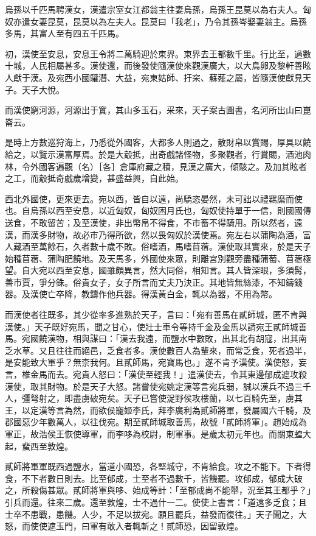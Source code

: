 \begin{pinyinscope}
烏孫以千匹馬聘漢女，漢遣宗室女江都翁主往妻烏孫，烏孫王昆莫以為右夫人。匈奴亦遣女妻昆莫，昆莫以為左夫人。昆莫曰「我老」，乃令其孫岑娶妻翁主。烏孫多馬，其富人至有四五千匹馬。

初，漢使至安息，安息王令將二萬騎迎於東界。東界去王都數千里。行比至，過數十城，人民相屬甚多。漢使還，而後發使隨漢使來觀漢廣大，以大鳥卵及黎軒善眩人獻于漢。及宛西小國驩潛、大益，宛東姑師、扜穼、蘇薤之屬，皆隨漢使獻見天子。天子大悅。

而漢使窮河源，河源出于窴，其山多玉石，采來，天子案古圖書，名河所出山曰崑崙云。

是時上方數巡狩海上，乃悉從外國客，大都多人則過之，散財帛以賞賜，厚具以饒給之，以覽示漢富厚焉。於是大觳抵，出奇戲諸怪物，多聚觀者，行賞賜，酒池肉林，令外國客遍觀（名）［各］倉庫府藏之積，見漢之廣大，傾駭之。及加其眩者之工，而觳抵奇戲歲增變，甚盛益興，自此始。

西北外國使，更來更去。宛以西，皆自以遠，尚驕恣晏然，未可詘以禮羈縻而使也。自烏孫以西至安息，以近匈奴，匈奴困月氏也，匈奴使持單于一信，則國國傳送食，不敢留苦；及至漢使，非出幣帛不得食，不市畜不得騎用。所以然者，遠漢，而漢多財物，故必市乃得所欲，然以畏匈奴於漢使焉。宛左右以蒲陶為酒，富人藏酒至萬餘石，久者數十歲不敗。俗嗜酒，馬嗜苜蓿。漢使取其實來，於是天子始種苜蓿、蒲陶肥饒地。及天馬多，外國使來眾，則離宮別觀旁盡種蒲萄、苜蓿極望。自大宛以西至安息，國雖頗異言，然大同俗，相知言。其人皆深眼，多須髯，善市賈，爭分銖。俗貴女子，女子所言而丈夫乃決正。其地皆無絲漆，不知鑄錢器。及漢使亡卒降，教鑄作他兵器。得漢黃白金，輒以為器，不用為幣。

而漢使者往既多，其少從率多進熟於天子，言曰：「宛有善馬在貳師城，匿不肯與漢使。」天子既好宛馬，聞之甘心，使壯士車令等持千金及金馬以請宛王貳師城善馬。宛國饒漢物，相與謀曰：「漢去我遠，而鹽水中數敗，出其北有胡寇，出其南乏水草。又且往往而絕邑，乏食者多。漢使數百人為輩來，而常乏食，死者過半，是安能致大軍乎？無柰我何。且貳師馬，宛寶馬也。」遂不肯予漢使。漢使怒，妄言，椎金馬而去。宛貴人怒曰：「漢使至輕我！」遣漢使去，令其東邊郁成遮攻殺漢使，取其財物。於是天子大怒。諸嘗使宛姚定漢等言宛兵弱，誠以漢兵不過三千人，彊弩射之，即盡虜破宛矣。天子已嘗使浞野侯攻樓蘭，以七百騎先至，虜其王，以定漢等言為然，而欲侯寵姬李氏，拜李廣利為貳師將軍，發屬國六千騎，及郡國惡少年數萬人，以往伐宛。期至貳師城取善馬，故號「貳師將軍」。趙始成為軍正，故浩侯王恢使導軍，而李哆為校尉，制軍事。是歲太初元年也。而關東蝗大起，蜚西至敦煌。

貳師將軍軍既西過鹽水，當道小國恐，各堅城守，不肯給食。攻之不能下。下者得食，不下者數日則去。比至郁成，士至者不過數千，皆饑罷。攻郁成，郁成大破之，所殺傷甚眾。貳師將軍與哆、始成等計：「至郁成尚不能舉，況至其王都乎？」引兵而還。往來二歲。還至敦煌，士不過什一二。使使上書言：「道遠多乏食；且士卒不患戰，患饑。人少，不足以拔宛。願且罷兵，益發而復往。」天子聞之，大怒，而使使遮玉門，曰軍有敢入者輒斬之！貳師恐，因留敦煌。


\end{pinyinscope}
